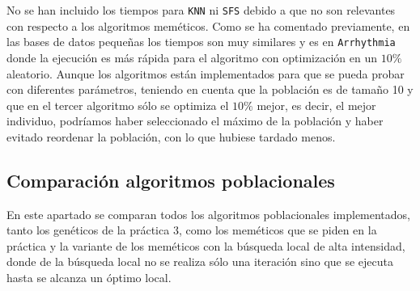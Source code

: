 \documentclass[11pt,leqno]{article}
\begin{document}
\pgfplotstabletranspose[input colnames to=DB,columns={TW,TL,TA}]\dataTimes{\dataGlobal}

\begin{center}
\dataTimes
\end{center}


\begin{center}
\end{center}

No se han incluido los tiempos para \texttt{KNN} ni \texttt{SFS} debido a que no son relevantes con respecto a los algoritmos meméticos. Como se ha comentado previamente, en las bases de datos pequeñas los tiempos son muy similares y es en \texttt{Arrhythmia} donde la ejecución es más rápida para el algoritmo con optimización en un $10\%$ aleatorio. Aunque los algoritmos están implementados para que se pueda probar con diferentes parámetros, teniendo en cuenta que la población es de tamaño 10 y que en el tercer algoritmo sólo se optimiza el $10\%$ mejor, es decir, el mejor individuo, podríamos haber seleccionado el máximo de la población y haber evitado reordenar la población, con lo que hubiese tardado menos.

\subsection{Comparación algoritmos poblacionales}

	En este apartado se comparan todos los algoritmos poblacionales implementados, tanto los genéticos de la práctica 3, como los meméticos que se piden en la práctica y la variante de los meméticos con la búsqueda local de alta intensidad, donde de la búsqueda local no se realiza sólo una iteración sino que se ejecuta hasta se alcanza un óptimo local. 
\end{document}
